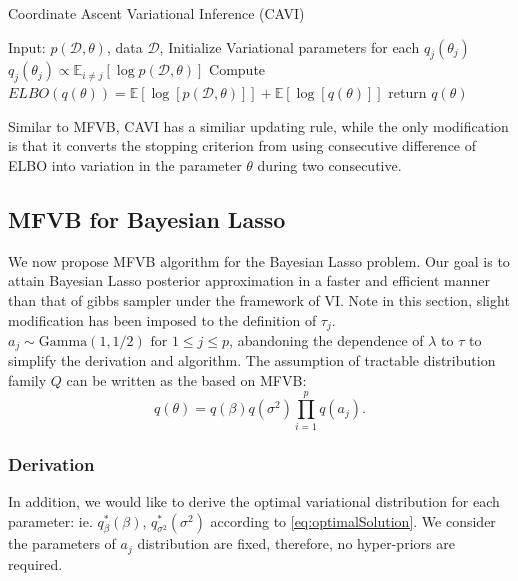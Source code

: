 \begin{algorithm}
	\caption{Coordinate Ascent Variational Inference (CAVI)}
	\begin{algorithmic}[1]
		
		\State Input: $p(\mathcal{D},\theta)$, data $\mathcal{D}$, Initialize Variational parameters for each $q_j(\theta_j)$
		\State $q_j(\theta_j) \propto \mathbb{E}_{i\neq j}[\log p(\mathcal{D},\theta)]$
		\EndFor
		\State Compute $ELBO(q(\theta)) = \mathbb{E}[\log[p(\mathcal{D},\theta)]] + \mathbb{E}[\log[q(\theta)]]$
		\EndWhile 
		\State return $q(\theta)$
		
		
		
	\end{algorithmic}
\end{algorithm}
Similar to MFVB, CAVI has a similiar updating rule, while the only modification is that it converts the stopping criterion from using consecutive difference of ELBO into variation in the parameter $\theta$ during two consecutive.

\subsection{MFVB for Bayesian Lasso}
We now propose MFVB algorithm for the Bayesian Lasso problem. Our goal is to attain Bayesian Lasso posterior approximation in a faster and efficient manner than that of gibbs sampler under the framework of VI. Note in this section, slight modification has been imposed to the definition of $\tau_j$. $a_j \sim \text{Gamma}(1,1/2)\text{ for }1\leq j \leq p$, abandoning the dependence of $\lambda$ to $\tau$ to simplify the derivation and algorithm. The assumption of tractable distribution family $Q$ can be written as the based on MFVB:
\begin{equation}
	q(\theta) = q(\beta)q(\sigma^2)\prod_{i=1}^p q(a_j).
\end{equation}

\subsubsection{Derivation}
In addition, we would like to derive the optimal variational distribution for each parameter: ie. $q_{\beta}^*(\beta)$, $q_{\sigma^2}^*(\sigma^2)$ according to \autoref{eq:optimalSolution}. We consider the parameters of $a_j$ distribution are fixed, therefore, no hyper-priors are required.

